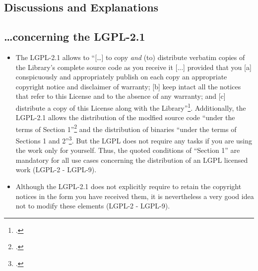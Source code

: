 \subsection{Discussions and Explanations}
\subsection{\ldots concerning the LGPL-2.1}

\begin{itemize}
  
  \item The LGPL-2.1 allows to \enquote{[\ldots] to copy \emph{and} (to)
  distribute verbatim copies of the Library's complete source code as you
  receive it [...] provided that you [a] conspicuously and appropriately publish
  on each copy an appropriate copyright notice and disclaimer of warranty; [b]
  keep intact all the notices that refer to this License and to the absence of
  any warranty; and [c] distribute a copy of this License along with the
  Library}\footcite[cf.][\nopage wp.\ §1, emphasizes by
  KR]{Lgpl21OsiLicense1999a}. Additionally, the LGPL-2.1 allows the 
  distribution of the modfied source code \enquote{under the terms of Section
  1}\footcite[cf.][\nopage wp.\ §2]{Lgpl21OsiLicense1999a} and the distribution
  of binaries \enquote{under the terms of Sections 1 and
  2}\footcite[cf.][\nopage wp.\ §4]{Lgpl21OsiLicense1999a}. But the LGPL does
  not require any tasks if you are using the work only for yourself. Thus, the
  quoted conditions of \enquote{Section 1} are mandatory for all use cases
  concerning the distribution of an LGPL licensed work (LGPL-2 - LGPL-9).

  \item Although the LGPL-2.1 does not explicitly require to retain the
  copyright notices in the form you have received them, it is nevertheless a
  very good idea not to modify these elements (LGPL-2 - LGPL-9).
  

\end{itemize}

